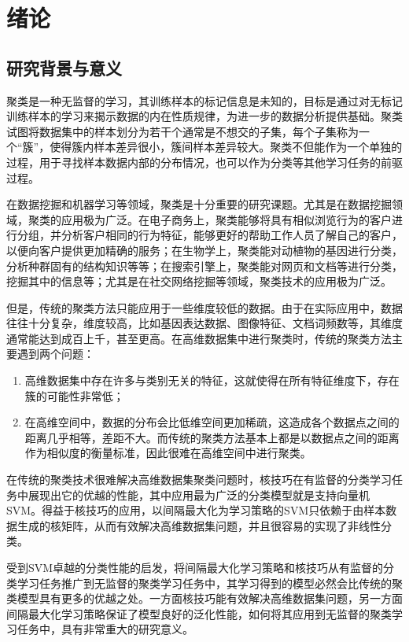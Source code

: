 \chapter{绪论}

\section{研究背景与意义}

聚类是一种无监督的学习，其训练样本的标记信息是未知的，目标是通过对无标记训练样本的学习来揭示数据的内在性质规律，为进一步的数据分析提供基础。聚类试图将数据集中的样本划分为若干个通常是不想交的子集，每个子集称为一个“簇”，使得簇内样本差异很小，簇间样本差异较大。聚类不但能作为一个单独的过程，用于寻找样本数据内部的分布情况，也可以作为分类等其他学习任务的前驱过程。

在数据挖掘和机器学习等领域，聚类是十分重要的研究课题。尤其是在数据挖掘领域，聚类的应用极为广泛。在电子商务上，聚类能够将具有相似浏览行为的客户进行分组，并分析客户相同的行为特征，能够更好的帮助工作人员了解自己的客户，以便向客户提供更加精确的服务；在生物学上，聚类能对动植物的基因进行分类，分析种群固有的结构知识等等；在搜索引擎上，聚类能对网页和文档等进行分类，挖掘其中的信息等；尤其是在社交网络挖掘等领域，聚类技术的应用极为广泛。

但是，传统的聚类方法只能应用于一些维度较低的数据。由于在实际应用中，数据往往十分复杂，维度较高，比如基因表达数据、图像特征、文档词频数等，其维度通常能达到成百上千，甚至更高。在高维数据集中进行聚类时，传统的聚类方法主要遇到两个问题：
  \begin{enumerate}[fullwidth,itemindent=24pt]
  \item 高维数据集中存在许多与类别无关的特征，这就使得在所有特征维度下，存在簇的可能性非常低；
  \item 在高维空间中，数据的分布会比低维空间更加稀疏，这造成各个数据点之间的距离几乎相等，差距不大。而传统的聚类方法基本上都是以数据点之间的距离作为相似度的衡量标准，因此很难在高维空间中进行聚类。
  \end{enumerate}
  
在传统的聚类技术很难解决高维数据集聚类问题时，核技巧在有监督的分类学习任务中展现出它的优越的性能，其中应用最为广泛的分类模型就是支持向量机SVM。得益于核技巧的应用，以间隔最大化为学习策略的SVM只依赖于由样本数据生成的核矩阵，从而有效解决高维数据集问题，并且很容易的实现了非线性分类。

受到SVM卓越的分类性能的启发，将间隔最大化学习策略和核技巧从有监督的分类学习任务推广到无监督的聚类学习任务中，其学习得到的模型必然会比传统的聚类模型具有更多的优越之处。一方面核技巧能有效解决高维数据集问题，另一方面间隔最大化学习策略保证了模型良好的泛化性能，如何将其应用到无监督的聚类学习任务中，具有非常重大的研究意义。


